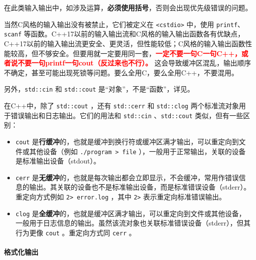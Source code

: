 在此类输入输出中，如涉及运算，\textbf{必须使用括号}，否则会出现优先级错误的问题。

当然C风格的输入输出没有被禁止，它们被定义在 \verb|<cstdio>| 中，使用 \verb|printf|、\verb|scanf| 等函数。C++17以前的输入输出流和C风格的输入输出函数各有优缺点，C++17以前的输入输出流更安全、更灵活，但性能较低；C风格的输入输出函数性能较高，但不够安全。但要用就一定要用同一套，\textcolor{red}{\bfseries 一定不要一句C一句C++，或者说不要一句printf一句cout（反过来也不行）。} 这会导致缓冲区混乱，输出顺序不确定，甚至可能出现死锁等问题。要么全用C，要么全用C++，不要混用。

另外，\verb|std::cin| 和 \verb|std::cout| 是“对象”，不是“函数”，详见。

在C++中，除了 \verb|std::cout| ，还有 \verb|std::cerr| 和 \verb|std::clog| 两个标准流对象用于错误输出和日志输出。它们的用法和 \verb|std::cin| 、\verb|std::cout| 类似，但有一些区别：
\begin{itemize}
    \item \verb|cout| 是\textbf{行缓冲}的，也就是缓冲到换行符或缓冲区满才输出，可以重定向到文件或其他设备（例如 \verb|./program > file| ），一般用于正常输出，关联的设备是标准输出设备（stdout）。
    \item \verb|cerr| 是\textbf{无缓冲}的，也就是每次输出都会立即显示，不会缓冲，常用作错误信息的输出。其关联的设备也不是标准输出设备，而是标准错误设备（stderr）。重定向方式例如 \verb|2> error.log| ，其中 \verb|2>| 表示重定向标准错误输出。
    \item \verb|clog| 是\textbf{全缓冲}的，也就是缓冲区满才输出，可以重定向到文件或其他设备，一般用于日志信息的输出。虽然该流对象也关联标准错误设备（stderr），但其行为更像 \verb|cout| 。重定向方式同 \verb|cerr| 。
\end{itemize}

\paragraph{格式化输出}

